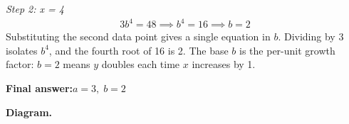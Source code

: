 \documentclass[11pt]{article}
\begin{document}
\textit{Step 2: x = 4}
\[\begin{gathered}
3b^4 = 48 \implies b^4 = 16 \implies b = 2
\end{gathered}\]
Substituting the second data point gives a single equation in \( b \). Dividing by 3 isolates \( b^4 \), and the fourth root of 16 is 2. The base \( b \) is the per-unit growth factor: \( b = 2 \) means \( y \) doubles each time \( x \) increases by 1.

\begin{answerbox}
\textbf{Final answer:}\quad \(\displaystyle  a = 3, \; b = 2 \)
\end{answerbox}
\textbf{Diagram.}

\begin{center}
\end{center}
\end{document}
